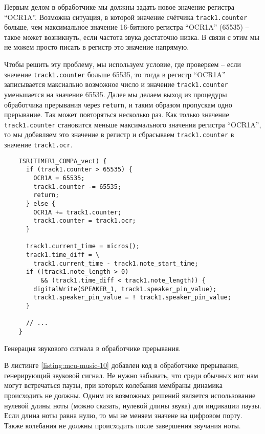 \documentclass[../sparc.tex]{subfiles}
\begin{document}
Первым делом в обработчике мы должны задать новое значение регистра ``OCR1A''.
Возможна ситуация, в которой значение счётчика \texttt{track1.counter}
больше, чем максимальное значение 16-битного регистра ``OCR1A'' (65535) -- такое
может возникнуть, если частота звука достаточно низка.  В связи с этим мы не
можем просто писать в регистр это значение напрямую.

Чтобы решить эту проблему, мы используем условие, где проверяем -- если значение
\texttt{track1.counter} больше 65535, то тогда в регистр ``OCR1A''
записывается максиально возможное число и значение
\texttt{track1.counter} уменьшается на значение 65535.  Далее мы делаем
выход из процедуры обработчика прерывания через \texttt{return}, и
таким образом пропускам одно прерывание.  Так может повторяться несколько раз.
Как только значение \texttt{track1.counter} становится меньше
максимального значения регистра ``OCR1A'', то мы добавляем это значение в
регистр и сбрасываем \texttt{track1.counter} в значение
\texttt{track1.ocr}.

\begin{listing}[H]
  \begin{verbatim}
    ISR(TIMER1_COMPA_vect) {
      if (track1.counter > 65535) {
        OCR1A = 65535;
        track1.counter -= 65535;
        return;
      } else {
        OCR1A += track1.counter;
        track1.counter = track1.ocr;
      }

      track1.current_time = micros();
      track1.time_diff = \
        track1.current_time - track1.note_start_time;
      if ((track1.note_length > 0)
          && (track1.time_diff < track1.note_length)) {
        digitalWrite(SPEAKER_1, track1.speaker_pin_value);
        track1.speaker_pin_value = ! track1.speaker_pin_value;
      }

      // ...
    }
  \end{verbatim}
  \caption{Генерация звукового сигнала в обработчике прерывания.}
  \label{listing:mcu-music-10}
\end{listing}

В листинге \ref{listing:mcu-music-10} добавлен код в обработчике прерывания,
генерирующий звуковой сигнал.  Не нужно забывать, что среди обычных нот нам
могут встречаться паузы, при которых колебания мембраны динамика происходить не
должны.  Одним из возможных решений является использование нулевой длины ноты
(можно сказать, нулевой длины звука) для индикации паузы.  Если длина ноты равна
нулю, то мы не меняем значене на цифровом порту.  Также колебания не должны
происходить после завершения звучания ноты.
\end{document}
